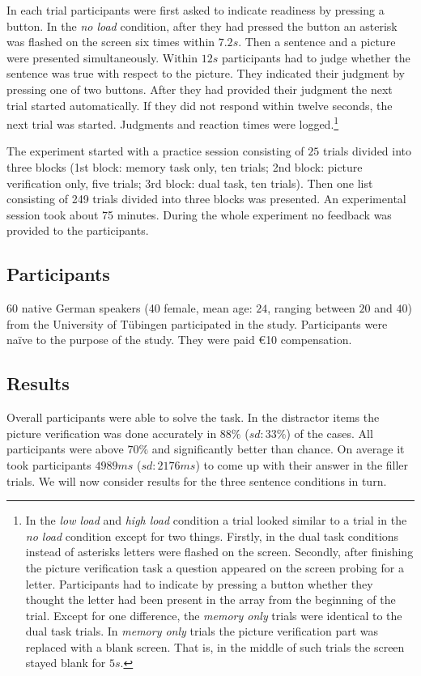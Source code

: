 \documentclass[fleqn,reqno,10pt,draft]{article}
\begin{document}
In each trial participants were first asked to indicate readiness by
pressing a button. In the {\it no load} condition, after they had
pressed the button an asterisk was flashed on the screen six times
within $7.2s$. Then a sentence and a picture were presented
simultaneously. Within $12s$ participants had to judge whether the
sentence was true with respect to the picture. They indicated their
judgment by pressing one of two buttons. After they had provided their
judgment the next trial started automatically. If they did not respond
within twelve seconds, the next trial was started. Judgments and
reaction times were logged.\footnote{In the {\it low load} and {\it
    high load} condition a trial looked similar to a trial in the {\it
    no load} condition except for two things. Firstly, in the dual
  task conditions instead of asterisks letters were flashed on the
  screen. Secondly, after finishing the picture verification task a
  question appeared on the screen probing for a letter. Participants
  had to indicate by pressing a button whether they thought the letter
  had been present in the array from the beginning of the
  trial. Except for one difference, the {\it memory only} trials were
  identical to the dual task trials. In {\it memory only} trials the
  picture verification part was replaced with a blank screen. That is,
  in the middle of such trials the screen stayed blank for $5s$. }

The experiment started with a practice session consisting of $25$ trials divided into three blocks (1st block: memory task only, ten trials; 2nd block: picture verification only, five trials; 3rd block: dual task, ten trials). Then one list consisting of 249 trials divided into three blocks was presented. An experimental session took about 75 minutes. During the whole experiment no feedback was provided to the participants.

\subsection{Participants}
60 native German speakers (40 female, mean age: $24$, ranging between $20$ and $40$) from the University of T{\"u}bingen participated in the study. Participants were na\"ive to the purpose of the study. They were paid \euro{10} compensation. 

\subsection{Results}
Overall participants were able to solve the task. In the distractor items the picture verification was done accurately in $88\%$ ($sd: 33\%$) of the cases. All participants were above $70\%$ and significantly better than chance. On average it took participants $4989ms$ ($sd:2176ms$) to come up with their answer in the filler trials. We will now consider results for the three sentence conditions in turn.
\end{document}
